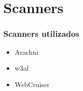 \section{Scanners}

\begin{frame}
 \frametitle{Scanners utilizados}
 
 \begin{itemize}[<+->]
 	\item Arachni
 	\item w3af
 	\item WebCruiser
 \end{itemize}
\end{frame}